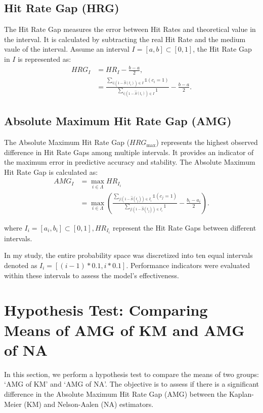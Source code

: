 \subsection{Hit Rate Gap (HRG)}
The Hit Rate Gap measures the error between Hit Rates and theoretical value in the interval. It is calculated by subtracting the real Hit Rate and the medium vaule of the interval. Assume an interval $I = [a, b] \subset  [0, 1]$, the Hit Rate Gap in $I$ is represented as:
\begin{align}
    HRG_I& = HR_I - \frac{b-a}{2},\label{eq:hrg}\\
    &=\frac{\sum_{i|(1 - \hat S(t_i)) \in I}\mathds{1}(c_i = 1)}{\sum_{i|(1 - \hat S(t_i)) \in I} 1 } - \frac{b-a}{2}.\label{eq:hrg_e}
\end{align}

\subsection{Absolute Maximum Hit Rate Gap (AMG)}
The Absolute Maximum Hit Rate Gap (\(HRG_{\text{max}}\)) represents the highest observed difference in Hit Rate Gaps among multiple intervals. It provides an indicator of the maximum error in predictive accuracy and stability. The Absolute Maximum Hit Rate Gap is calculated as:
\begin{align}
    AMG_I &= \max_{i \in \Lambda} HR_{I_i}\label{eq:amg}\\
    &=\max_{i \in \Lambda}\left( \frac{\sum_{j|(1 - \hat S(t_j)) \in I_i}\mathds{1}(c_j = 1)}{\sum_{j|(1 - \hat S(t_j)) \in I_i} 1 } - \frac{b_i-a_i}{2}\right).\label{eq:amg_e}
\end{align}

where $ I_i = [a_i, b_i] \subset [0, 1], HR_{I_i}$ represent the Hit Rate Gaps between different intervals.

In my study, the entire probability space was discretized into ten equal intervals denoted as $I_i = [(i-1)*0.1, i*0.1]$. Performance indicators were evaluated within these intervals to assess the model's effectiveness.

\section{Hypothesis Test: Comparing Means of AMG of KM and AMG of NA}
In this section, we perform a hypothesis test to compare the means of two groups: `AMG of KM' and `AMG of NA'. The objective is to assess if there is a significant difference in the Absolute Maximum Hit Rate Gap (AMG) between the Kaplan-Meier (KM) and Nelson-Aalen (NA) estimators.

